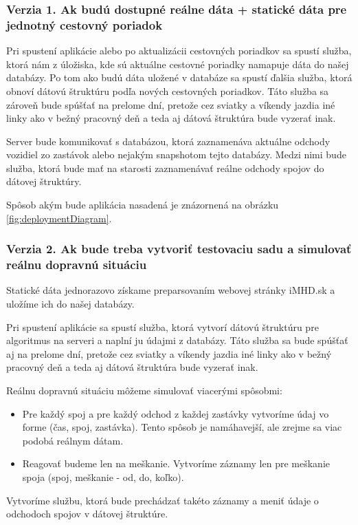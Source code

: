 \subsubsection{Verzia 1. Ak budú dostupné reálne dáta + statické dáta pre jednotný cestovný poriadok}
Pri spustení aplikácie alebo po aktualizácii cestovných poriadkov sa spustí služba, ktorá nám z úložiska, kde sú aktuálne cestovné poriadky namapuje dáta do našej databázy. Po tom ako budú dáta uložené v databáze sa spustí ďalšia služba, ktorá obnoví dátovú štruktúru podľa nových cestovných poriadkov. Táto služba sa zároveň bude spúšťať na prelome dní, pretože cez sviatky a víkendy jazdia iné linky ako v bežný pracovný deň a teda aj dátová štruktúra bude vyzerať inak.
 
Server bude komunikovať s databázou, ktorá zaznamenáva aktuálne odchody vozidiel zo zastávok alebo nejakým snapshotom tejto databázy. Medzi nimi bude služba, ktorá bude mať na starosti zaznamenávať reálne odchody spojov do dátovej štruktúry. 

Spôsob akým bude aplikácia nasadená je znázornená na obrázku \ref{fig:deploymentDiagram}.

\subsubsection{Verzia 2. Ak bude treba vytvoriť testovaciu sadu a simulovať reálnu dopravnú situáciu}
Statické dáta jednorazovo získame preparsovaním webovej stránky iMHD.sk a uložíme ich do našej databázy. 

Pri spustení aplikácie sa spustí služba, ktorá vytvorí dátovú štruktúru pre algoritmus na serveri a naplní ju údajmi z databázy. Táto služba sa bude spúšťať aj na prelome dní, pretože cez sviatky a víkendy jazdia iné linky ako v bežný pracovný deň a teda aj dátová štruktúra bude vyzerať inak. 

Reálnu dopravnú situáciu môžeme simulovať viacerými spôsobmi:
\begin{itemize}
\item{Pre každý spoj a pre každý odchod z každej zastávky vytvoríme údaj vo forme (čas, spoj, zastávka). Tento spôsob je namáhavejší, ale zrejme sa viac podobá reálnym dátam. }
\item{Reagovať budeme len na meškanie. Vytvoríme záznamy len pre meškanie spoja (spoj, meškanie - od, do, koľko).}
\end{itemize}

Vytvoríme službu, ktorá bude prechádzať takéto záznamy a meniť údaje o odchodoch spojov v dátovej štruktúre.

